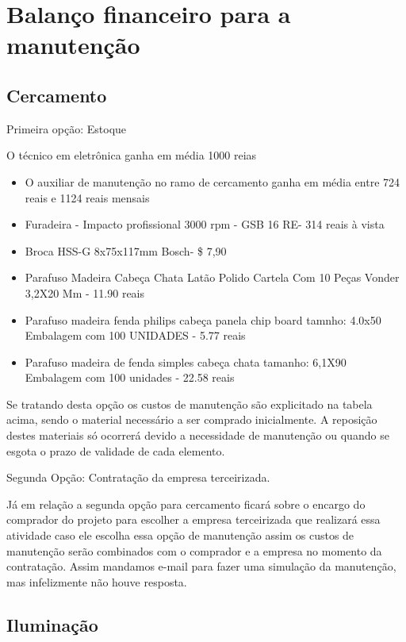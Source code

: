 \section{Balanço financeiro para a manutenção}

\subsection{Cercamento}

Primeira opção: Estoque

O técnico em eletrônica ganha em média 1000 reias

\begin{itemize}
          \item O auxiliar de manutenção no ramo de cercamento ganha em média entre 724 reais e 1124 reais mensais \cite{catho}
          \item Furadeira - Impacto profissional 3000 rpm - GSB 16 RE- 314 reais à vista
          \item Broca HSS-G 8x75x117mm Bosch- \$ 7,90 \cite{agrotama}
          \item Parafuso Madeira Cabeça Chata Latão Polido Cartela Com 10 Peças Vonder 3,2X20 Mm - 11.90 reais \cite{fixpar}
          \item Parafuso madeira fenda philips cabeça panela chip board tamnho: 4.0x50 Embalagem com 100 UNIDADES - 5.77 reais \cite{fixpar}
          \item Parafuso madeira de fenda simples cabeça chata tamanho: 6,1X90 Embalagem com 100 unidades - 22.58 reais \cite{fixpar}
\end{itemize}

	Se tratando desta opção os custos de manutenção são explicitado na tabela acima, sendo o material necessário a ser comprado inicialmente. A reposição destes materiais só ocorrerá devido a necessidade de manutenção ou quando se esgota o prazo de validade de cada elemento.
	
Segunda Opção: Contratação da empresa terceirizada.

	Já em relação a segunda opção para cercamento ficará sobre o encargo do comprador do projeto para escolher a empresa terceirizada que realizará essa atividade caso ele escolha essa opção de manutenção assim os custos de manutenção serão combinados com o comprador e a empresa no momento da contratação. Assim mandamos e-mail para fazer uma simulação da manutenção, mas infelizmente não houve resposta.
	
\subsection{Iluminação}
	

